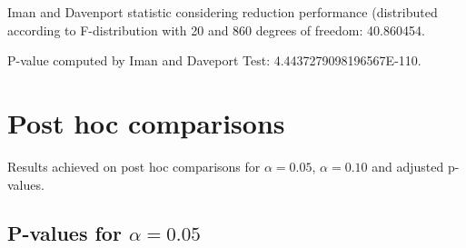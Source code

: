 \documentclass[a4paper,10pt]{article}
\begin{document}
\begin{landscape}
Iman and Davenport statistic considering reduction performance (distributed according to F-distribution with 20 and 860 degrees of freedom: 40.860454.

P-value computed by Iman and Daveport Test: 4.4437279098196567E-110.\newline



\pagebreak

\section{Post hoc comparisons}

Results achieved on post hoc comparisons for $\alpha = 0.05$, $\alpha = 0.10$ and adjusted p-values.

\subsection{P-values for $\alpha=0.05$}


\end{landscape}
\end{document}
